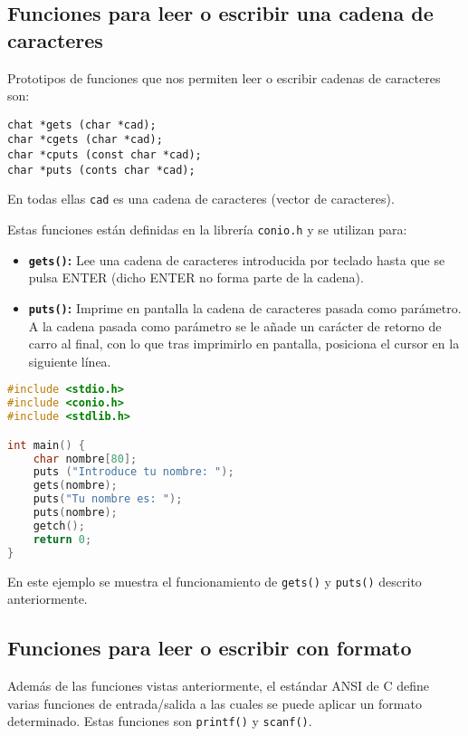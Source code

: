 \subsection{Funciones para leer o escribir una cadena de caracteres}{
Prototipos de funciones que nos permiten leer o escribir cadenas de caracteres son:

\texttt{chat *gets (char *cad);}\\
\texttt{char *cgets (char *cad);}\\
\texttt{char *cputs (const char *cad);}\\
\texttt{char *puts (conts char *cad);}

En todas ellas \texttt{cad} es una cadena de caracteres (vector de caracteres).

Estas funciones están definidas en la librería \texttt{conio.h} y se utilizan para:
\begin{itemize}
	\item \textbf{\texttt{gets()}:} Lee una cadena de caracteres introducida por teclado hasta que se pulsa ENTER (dicho ENTER no forma parte de la cadena).
	\item \textbf{\texttt{puts()}:} Imprime en pantalla la cadena de caracteres pasada como parámetro. A la cadena pasada como parámetro se le añade un carácter de retorno de carro al final, con lo que tras imprimirlo en pantalla, posiciona el cursor en la siguiente línea.
\end{itemize}
\begin{Ejemplo}
\begin{lstlisting}[language=C]
#include <stdio.h>
#include <conio.h>
#include <stdlib.h>

int main() {
    char nombre[80];
    puts ("Introduce tu nombre: ");
    gets(nombre);
    puts("Tu nombre es: ");
    puts(nombre);
    getch();
    return 0;
}
\end{lstlisting}
\Explicacion
En este ejemplo se muestra el funcionamiento de \texttt{gets()} y \texttt{puts()} descrito anteriormente.
\end{Ejemplo}
}
\subsection{Funciones para leer o escribir con formato}{
Además de las funciones vistas anteriormente, el estándar ANSI de C define varias funciones de entrada/salida a las cuales se puede aplicar un formato determinado. Estas funciones son \texttt{printf()} y \texttt{scanf()}.
}
